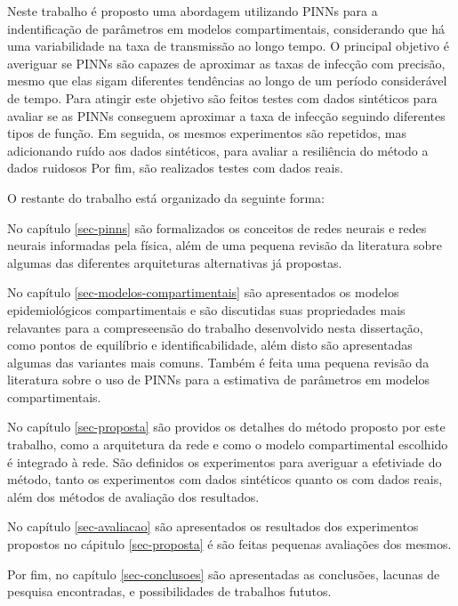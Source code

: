 Neste trabalho é proposto uma abordagem utilizando PINNs para a indentificação 
de parâmetros em modelos compartimentais, considerando que há uma variabilidade
na taxa de transmissão ao longo tempo. O principal objetivo é averiguar se PINNs
são capazes de aproximar as taxas de infecção com precisão, mesmo que elas  
sigam diferentes tendências ao longo de um período considerável de tempo.
Para atingir este objetivo são feitos testes com dados sintéticos para avaliar
se as PINNs conseguem aproximar a taxa de infecção seguindo diferentes tipos de
função. 
Em seguida, os mesmos experimentos são repetidos, mas adicionando ruído aos
dados sintéticos, para avaliar a resiliência do método a dados ruidosos
Por fim, são realizados testes com dados reais.

O restante do trabalho está organizado da seguinte forma: 

No capítulo \ref{sec-pinns} são formalizados os conceitos de redes neurais e 
redes neurais informadas pela física, além de uma pequena revisão da literatura
sobre algumas das diferentes arquiteturas alternativas já propostas. 

No capítulo \ref{sec-modelos-compartimentais} são apresentados os modelos 
epidemiológicos compartimentais e são discutidas suas propriedades mais relavantes 
para a compreseensão do trabalho desenvolvido nesta dissertação, como pontos de 
equilíbrio e identificabilidade, além disto são apresentadas algumas das variantes
mais comuns. 
Também é feita uma pequena revisão da literatura sobre o uso de PINNs para a 
estimativa de parâmetros em modelos compartimentais.

No capítulo \ref{sec-proposta} são providos os detalhes do método proposto por este 
trabalho, como a arquitetura da rede e como o modelo compartimental escolhido é 
integrado à rede. São definidos os experimentos para averiguar a efetiviade
do método, tanto os experimentos com dados sintéticos quanto os com dados reais,
além dos métodos de avaliação dos resultados. 

No capítulo \ref{sec-avaliacao} são apresentados os resultados dos experimentos
propostos no cápitulo \ref{sec-proposta} é são feitas pequenas avaliações dos 
mesmos.

Por fim, no capítulo \ref{sec-conclusoes} são apresentadas as conclusões, lacunas
de pesquisa encontradas, e 
possibilidades de trabalhos fututos.    